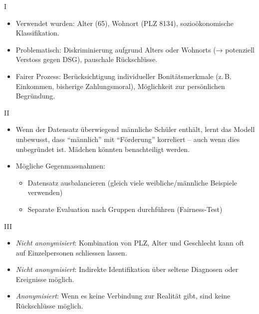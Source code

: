 \begin{aufgabe}{I}
\begin{itemize}
  \item Verwendet wurden: Alter (65), Wohnort (PLZ 8134), sozioökonomische Klassifikation.
  \item Problematisch: Diskriminierung aufgrund Alters oder Wohnorts (→ potenziell Verstoss gegen DSG), pauschale Rückschlüsse.
  \item Fairer Prozess: Berücksichtigung individueller Bonitätsmerkmale (z. B. Einkommen, bisherige Zahlungsmoral), Möglichkeit zur persönlichen Begründung.
\end{itemize}
\end{aufgabe}

\begin{aufgabe}{II}
\begin{itemize}
  \item Wenn der Datensatz überwiegend männliche Schüler enthält, lernt das Modell unbewusst, dass ``männlich'' mit ``Förderung'' korreliert – auch wenn dies unbegründet ist. Mädchen könnten benachteiligt werden.
  \item Mögliche Gegenmassnahmen:
    \begin{itemize}
      \item Datensatz ausbalancieren (gleich viele weibliche/männliche Beispiele verwenden)
      \item Separate Evaluation nach Gruppen durchführen (Fairness-Test)
    \end{itemize}
\end{itemize}
\end{aufgabe}

\begin{aufgabe}{III}
\begin{itemize}
  \item \textit{Nicht anonymisiert}: Kombination von PLZ, Alter und Geschlecht kann oft auf Einzelpersonen schliessen lassen.
  \item \textit{Nicht anonymisiert}: Indirekte Identifikation über seltene Diagnosen oder Ereignisse möglich.
  \item \textit{Anonymisiert}: Wenn es keine Verbindung zur Realität gibt, sind keine Rückschlüsse möglich.
\end{itemize}
\end{aufgabe}